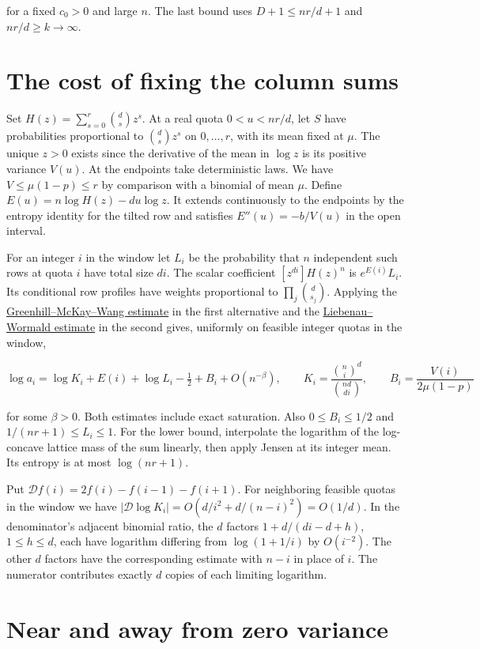 \documentclass[11pt]{article}
\begin{document}
for a fixed $c_0>0$ and large $n$. The last bound uses $D+1\le nr/d+1$ and $nr/d\ge k\to\infty$.

\section{The cost of fixing the column sums}

Set $H(z)=\sum_{s=0}^r\binom ds z^s$. At a real quota $0<u<nr/d$, let $S$ have probabilities proportional to $\binom ds z^s$ on $0,\ldots,r$, with its mean fixed at $\mu$. The unique $z>0$ exists since the derivative of the mean in $\log z$ is its positive variance $V(u)$. At the endpoints take deterministic laws. We have $V\le \mu(1-p)\le r$ by comparison with a binomial of mean $\mu$. Define $E(u)=n\log H(z)-du\log z$. It extends continuously to the endpoints by the entropy identity for the tilted row and satisfies $E''(u)=-b/V(u)$ in the open interval.

For an integer $i$ in the window let $L_i$ be the probability that $n$ independent such rows at quota $i$ have total size $di$. The scalar coefficient $[z^{di}]H(z)^n$ is $e^{E(i)}L_i$. Its conditional row profiles have weights proportional to $\prod_j\binom d{s_j}$. Applying the \hyperref[app:gmw]{Greenhill--McKay--Wang estimate} in the first alternative and the \hyperref[app:lw]{Liebenau--Wormald estimate} in the second gives, uniformly on feasible integer quotas in the window,

\[
\log a_i=\log K_i+E(i)+\log L_i-\tfrac12+B_i+O(n^{-\beta}),\qquad
K_i=\frac{\binom ni^d}{\binom{nd}{di}},\qquad
B_i=\frac{V(i)}{2\mu(1-p)}
\]

for some $\beta>0$. Both estimates include exact saturation. Also $0\le B_i\le1/2$ and $1/(nr+1)\le L_i\le1$. For the lower bound, interpolate the logarithm of the log-concave lattice mass of the sum linearly, then apply Jensen at its integer mean. Its entropy is at most $\log(nr+1)$.

Put $\mathcal D f(i)=2f(i)-f(i-1)-f(i+1)$. For neighboring feasible quotas in the window we have $|\mathcal D\log K_i|=O(d/i^2+d/(n-i)^2)=O(1/d)$. In the denominator's adjacent binomial ratio, the $d$ factors $1+d/(di-d+h)$, $1\le h\le d$, each have logarithm differing from $\log(1+1/i)$ by $O(i^{-2})$. The other $d$ factors have the corresponding estimate with $n-i$ in place of $i$. The numerator contributes exactly $d$ copies of each limiting logarithm.

\section{Near and away from zero variance}
\end{document}
